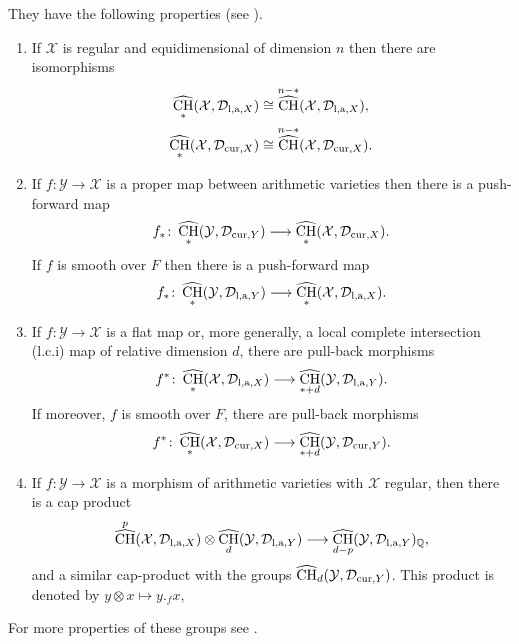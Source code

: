 \documentclass[10pt,twoside]{article}
\numberwithin{equation}{section}
\theoremstyle{plain}
\theoremstyle{definition}
\DeclareMathOperator{\cha}{\widehat{CH}}
\newcommand{\QQ}{{\mathbb Q}}
\newcommand{\las}{{\text{\rm l,a}}}
\newcommand{\D}{\text{{\rm cur}}}
\begin{document}
They have the following properties (see \cite{GilletSoule:aRRt}).
\begin{enumerate}
\item If $\mathcal{X}$ is regular and equidimensional of dimension
  $n$ then there are isomorphisms
  \begin{align*}
    \cha_{\ast}(\mathcal{X},\mathcal{D}_{\las,X})
    &\cong \cha^{n-\ast}(\mathcal{X},\mathcal{D}_{\las,X}),\\
    \cha_{\ast}(\mathcal{X},\mathcal{D}_{\D,X})
    &\cong \cha^{n-\ast}(\mathcal{X},\mathcal{D}_{\D,X}).
  \end{align*}
\item If $f\colon \mathcal{Y}\longrightarrow \mathcal{X}$ is a proper map
  between arithmetic varieties then there is a push-forward map
  \begin{displaymath}
    f_{\ast}\colon \cha_{\ast}(\mathcal{Y},\mathcal{D}_{\D,Y})\longrightarrow 
    \cha_{\ast}(\mathcal{X},\mathcal{D}_{\D,X}).
  \end{displaymath}
  If $f$ is smooth over $F$ then there is a push-forward map
  \begin{displaymath}
    f_{\ast}\colon \cha_{\ast}(\mathcal{Y},\mathcal{D}_{\las,Y})\longrightarrow 
    \cha_{\ast}(\mathcal{X},\mathcal{D}_{\las,X}).
  \end{displaymath}
\item If $f\colon \mathcal{Y}\longrightarrow \mathcal{X}$ is a flat map or,
  more generally, a
  local complete intersection (l.c.i) map of relative dimension $d$,
  there 
  are pull-back morphisms  
  \begin{displaymath}
    f^{\ast}\colon \cha_{\ast}(\mathcal{X},\mathcal{D}_{\las,X})\longrightarrow 
    \cha_{\ast+d}(\mathcal{Y},\mathcal{D}_{\las,Y}).    
  \end{displaymath}
  If moreover, $f$ is smooth over $F$, there are pull-back morphisms 
  \begin{displaymath}
    f^{\ast}\colon \cha_{\ast}(\mathcal{X},\mathcal{D}_{\D,X})\longrightarrow 
    \cha_{\ast+d}(\mathcal{Y},\mathcal{D}_{\D,Y}).    
  \end{displaymath}
\item If $f\colon \mathcal{Y}\longrightarrow \mathcal{X}$ is a morphism of
  arithmetic varieties with $\mathcal{X}$ regular, then there is a cap
  product
  \begin{displaymath}
    \cha^{p}(\mathcal{X},\mathcal{D}_{\las,X})\otimes 
    \cha_{d}(\mathcal{Y},\mathcal{D}_{\las,Y})\longrightarrow  
    \cha_{d-p}(\mathcal{Y},\mathcal{D}_{\las,Y})_{\QQ},
  \end{displaymath}
  and a similar cap-product with the groups
  $\cha_{d}(\mathcal{Y},\mathcal{D}_{\D,Y})$. This product is denoted
  by $y\otimes x\mapsto y._{f}x$, 

\end{enumerate}
For more properties of these groups see \cite{GilletSoule:aRRt}. 
\end{document}
